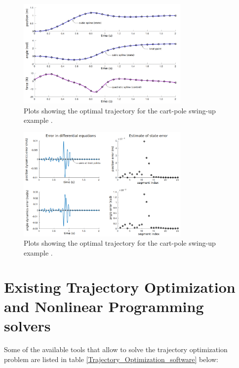 \documentclass{thesisreport}
\begin{document}
\newpage

\begin{figure}[h]
\centering
\includegraphics[width=0.75\textwidth]{Images/Trajectory/cart_pole_solved_b}
\caption{Plots showing the optimal trajectory for the cart-pole swing-up example \cite{Kelly2017}. }
\label{trajectory_problem_solution_b}
\end{figure}


\begin{figure}[h]
\centering
\includegraphics[width=0.75\textwidth]{Images/Trajectory/cart_pole_solved_c}
\caption{Plots showing the optimal trajectory for the cart-pole swing-up example \cite{Kelly2017}. }
\label{trajectory_problem_solution_c}
\end{figure}


\newpage

\section{Existing Trajectory Optimization and Nonlinear Programming solvers}

Some of the available tools that allow to solve the trajectory optimization problem are listed in table \ref{Trajectory_Optimization_software} below:
\end{document}
